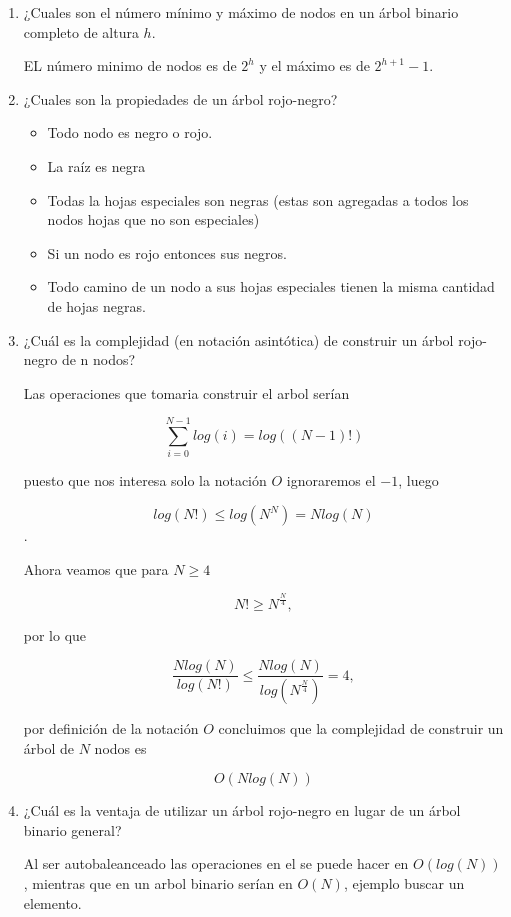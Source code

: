 \documentclass[letterpaper]{article}
\theoremstyle{definition}
\theoremstyle{lemathm}
\theoremstyle{lemademthm}
\begin{document}
\begin{enumerate}
		\item ¿Cuales son el número mínimo y máximo de nodos en un árbol binario completo de altura $h$.
		
		EL número minimo de nodos es de $2^h$ y el máximo es de $2^{h+1} - 1$.
		

		\item ¿Cuales son la propiedades de un árbol rojo-negro?
		
		\begin{itemize}
			\item Todo nodo es negro o rojo.
			\item La raíz es negra
			\item Todas la hojas especiales son negras (estas son agregadas a todos los nodos hojas que no son especiales)
			\item Si un nodo es rojo entonces sus negros.
			\item Todo camino de un nodo a sus hojas especiales tienen la misma cantidad de hojas negras.
		\end{itemize}
		
		\item ¿Cuál es la complejidad (en notación asintótica) de construir un árbol rojo-negro de n nodos?
		
		Las operaciones que tomaria construir el arbol serían

		\[\sum_{i=0}^{N-1} log(i) = log((N-1)!)\]

		puesto que nos interesa solo la notación $O$ ignoraremos el $-1$, luego

		\[log(N!) \leq log(N^N) = Nlog(N)\].

		Ahora veamos que para $N \geq 4$

		\[N! \geq N^{\frac{N}{4}},\]

		por lo que

		\[\frac{Nlog(N)}{log(N!)} \leq \frac{Nlog(N)}{log(N^{\frac{N}{4}})} = 4,\]

		por definición de la notación $O$ concluimos que la complejidad de construir un árbol de $N$ nodos es

		\[O(Nlog(N))\]

		\item ¿Cuál es la ventaja de utilizar un árbol rojo-negro en lugar de un árbol binario general?
		
		Al ser autobaleanceado las operaciones en el se puede hacer en $O(log(N))$, mientras que en un arbol binario serían en $O(N)$, ejemplo buscar un elemento.

		\newpage


\end{enumerate}
\end{document}
